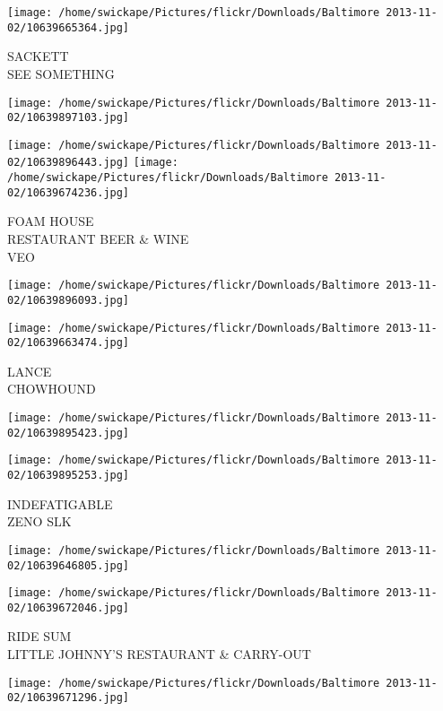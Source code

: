 \documentclass[10pt,letterpaper]{article}
\begin{document}
\vspace{0.25in}
\texttt{[image: /home/swickape/Pictures/flickr/Downloads/Baltimore 2013-11-02/10639665364.jpg]}

SACKETT\\
SEE SOMETHING
\pagebreak

\texttt{[image: /home/swickape/Pictures/flickr/Downloads/Baltimore 2013-11-02/10639897103.jpg]}

\vspace{0.25in}
\texttt{[image: /home/swickape/Pictures/flickr/Downloads/Baltimore 2013-11-02/10639896443.jpg]}
\texttt{[image: /home/swickape/Pictures/flickr/Downloads/Baltimore 2013-11-02/10639674236.jpg]}

FOAM HOUSE\\
RESTAURANT BEER \& WINE\\
VEO
\pagebreak

\texttt{[image: /home/swickape/Pictures/flickr/Downloads/Baltimore 2013-11-02/10639896093.jpg]}

\vspace{0.25in}
\texttt{[image: /home/swickape/Pictures/flickr/Downloads/Baltimore 2013-11-02/10639663474.jpg]}

LANCE\\
CHOWHOUND
\pagebreak

\texttt{[image: /home/swickape/Pictures/flickr/Downloads/Baltimore 2013-11-02/10639895423.jpg]}

\vspace{0.25in}
\texttt{[image: /home/swickape/Pictures/flickr/Downloads/Baltimore 2013-11-02/10639895253.jpg]}

INDEFATIGABLE\\
ZENO SLK
\pagebreak

\texttt{[image: /home/swickape/Pictures/flickr/Downloads/Baltimore 2013-11-02/10639646805.jpg]}

\vspace{0.25in}
\texttt{[image: /home/swickape/Pictures/flickr/Downloads/Baltimore 2013-11-02/10639672046.jpg]}

RIDE SUM\\
LITTLE JOHNNY'S RESTAURANT \& CARRY{-}OUT
\pagebreak

\texttt{[image: /home/swickape/Pictures/flickr/Downloads/Baltimore 2013-11-02/10639671296.jpg]}
\end{document}
